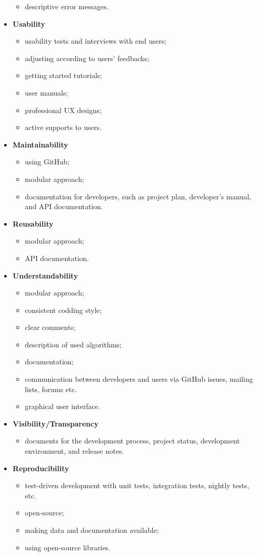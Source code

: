 \begin{itemize}
\begin{itemize}
    \item descriptive error messages.
\end{itemize}
\item \textbf{Usability}
\begin{itemize}
    \item usability tests and interviews with end users;
    \item adjusting according to users’ feedbacks;
    \item getting started tutorials;
    \item user manuals;
    \item professional UX designs;
    \item active supports to users.
\end{itemize}
\item \textbf{Maintainability}
\begin{itemize}
    \item using GitHub;
    \item modular approach;
    \item documentation for developers, such as project plan, developer’s manual, and API documentation.
\end{itemize}
\item \textbf{Reusability}
\begin{itemize}
    \item modular approach;
    \item API documentation.
\end{itemize}
\item \textbf{Understandability}
\begin{itemize}
    \item modular approach;
    \item consistent codding style;
    \item clear comments;
    \item description of used algorithms;
    \item documentation;
    \item communication between developers and users via GitHub issues, mailing lists, forums etc.
    \item graphical user interface.
\end{itemize}
\item \textbf{Visibility/Transparency}
\begin{itemize}
    \item documents for the development process, project status, development environment, and release notes.
\end{itemize}
\item \textbf{Reproducibility}
\begin{itemize}
    \item test-driven development with unit tests, integration tests, nightly tests, etc.
    \item open-source;
    \item making data and documentation available;
    \item using open-source libraries.
\end{itemize}
\end{itemize}
